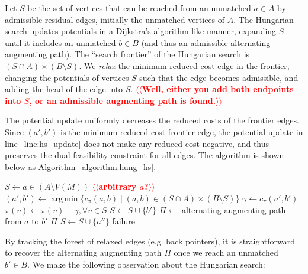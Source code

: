 \documentclass[11pt]{article}
\makeatletter
\DeclareMathOperator*{\argmin}{arg\,min}
\theoremstyle{plain}
\numberwithin{figure}{section}
\def\n@te#1{\textsf{\boldmath \textbf{$\langle\!\langle$#1$\rangle\!\rangle$}}\leavevmode}
\def\note#1{\textcolor{red}{\n@te{#1}}}
\makeatother
\begin{document}
Let $S$ be the set of vertices that can be reached from an unmatched $a \in A$
by admissible residual edges, initially the unmatched vertices of $A$.
The Hungarian search updates potentials in a Dijkstra's algorithm-like manner,
expanding $S$ until it includes an unmatched $b \in B$ (and thus an admissible
alternating augmenting path).
The ``search frontier'' of the Hungarian search is
$(S \cap A) \times (B \setminus S)$.
We \emph{relax} the minimum-reduced cost edge in the frontier, changing the
potentials of vertices $S$ such that the edge becomes admissible, and adding
the head of the edge into $S$.
\note{Well, either you add both endpoints into $S$, or an admissible augmenting path is found.}

The potential update uniformly decreases the reduced costs of the frontier
edges.
Since $(a', b')$ is the minimum reduced cost frontier edge, the potential
update in line~\ref{line:hs_update} does not make any reduced cost negative,
and thus preserves the dual feasibility constraint for all edges.
The algorithm is shown below as Algorithm~\ref{algorithm:hung_hs}.

\begin{figure*}
\centering
\begin{minipage}{.8\linewidth}
\begin{algorithm}[H]
\caption{Hungarian Search (matching)}
\label{algorithm:hung_hs}
\begin{algorithmic}[1]
	\State $S \gets a \in (A \setminus V(M))$ \note{arbitrary $a$?}
	\Repeat
		\State $(a', b') \gets \argmin\{c_\pi(a, b) \mid (a, b) \in (S \cap A) \times (B \setminus S)\}$
		\State $\gamma \gets c_\pi(a', b')$
		\State $\pi(v) \gets \pi(v) + \gamma, \forall v \in S$
			\label{line:hs_update}
		\State $S \gets S \cup \{b'\}$
		 
			\State $\Pi \gets$ alternating augmenting path from $a$ to $b'$
			\State\Return $\Pi$
		\Else {}
			\State $S \gets S \cup \{a''\}$
		\EndIf
	\State\Return failure
\EndFunction
\end{algorithmic}
\end{algorithm}
\end{minipage}
\end{figure*}

By tracking the forest of relaxed edges (e.g. back pointers), it is
straightforward to recover the alternating augmenting path $\Pi$ once we reach
an unmatched $b' \in B$.
We make the following observation about the Hungarian search:
\end{document}
